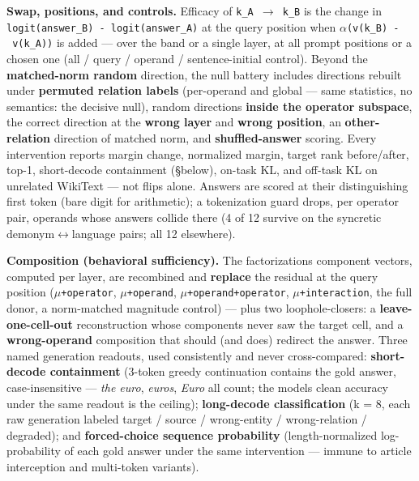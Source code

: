 \textbf{Swap, positions, and controls.} Efficacy of
\texttt{k\_A\ \ensuremath{\to}\ k\_B} is the change in
\texttt{logit(answer\_B)\ -\ logit(answer\_A)} at the query position
when \texttt{\ensuremath{\alpha}\textperiodcentered{}(v(k\_B)\ -\ v(k\_A))} is added --- over the band or a
single layer, at all prompt positions or a chosen one (all / query /
operand / sentence-initial control). Beyond the \textbf{matched-norm
random} direction, the null battery includes directions rebuilt under
\textbf{permuted relation labels} (per-operand and global --- same
statistics, no semantics: the decisive null), random directions
\textbf{inside the operator subspace}, the correct direction at the
\textbf{wrong layer} and \textbf{wrong position}, an
\textbf{other-relation} direction of matched norm, and
\textbf{shuffled-answer} scoring. Every intervention reports margin
change, normalized margin, target rank before/after, top-1, short-decode
containment (\S{}below), on-task KL, and off-task KL on unrelated WikiText
--- not flips alone. Answers are scored at their distinguishing first
token (bare digit for arithmetic); a tokenization guard drops, per
operator pair, operands whose answers collide there (4 of 12 survive on
the syncretic demonym\ensuremath{\leftrightarrow}language pairs; all 12 elsewhere).

\textbf{Composition (behavioral sufficiency).} The
factorization\textquotesingle s component vectors, computed per layer,
are recombined and \textbf{replace} the residual at the query position
(\texttt{\ensuremath{\mu}+operator}, \texttt{\ensuremath{\mu}+operand}, \texttt{\ensuremath{\mu}+operand+operator},
\texttt{\ensuremath{\mu}+interaction}, the full donor, a norm-matched magnitude
control) --- plus two loophole-closers: a \textbf{leave-one-cell-out}
reconstruction whose components never saw the target cell, and a
\textbf{wrong-operand} composition that should (and does) redirect the
answer. Three named generation readouts, used consistently and never
cross-compared: \textbf{short-decode containment} (3-token greedy
continuation contains the gold answer, case-insensitive --- \emph{the
euro}, \emph{euros}, \emph{Euro} all count; the model\textquotesingle s
clean accuracy under the same readout is the ceiling);
\textbf{long-decode classification} (k = 8, each raw generation labeled
target / source / wrong-entity / wrong-relation / degraded); and
\textbf{forced-choice sequence probability} (length-normalized
log-probability of each gold answer under the same intervention ---
immune to article interception and multi-token variants).

